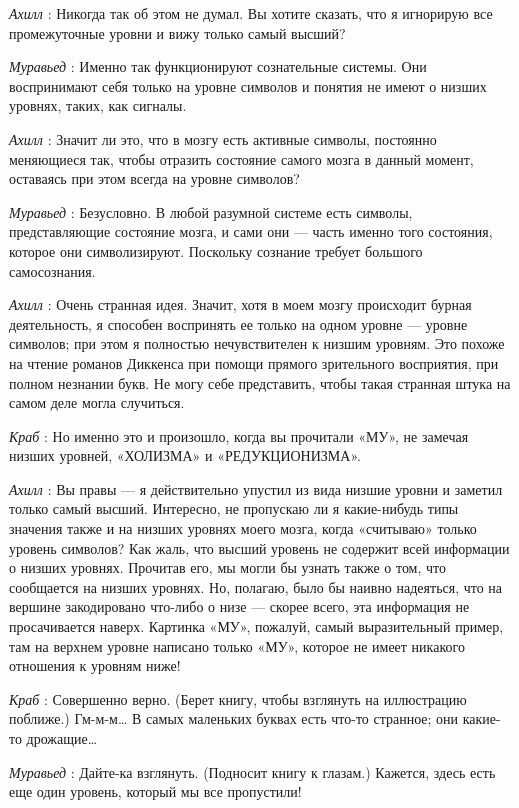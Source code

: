 \documentclass[../main.tex]{subfiles}
\begin{document}
\begin{dialogue}
\emph{Ахилл} : Никогда так об этом не думал. Вы хотите сказать, что я игнорирую все промежуточные уровни и вижу только самый высший?

\emph{Муравьед} : Именно так функционируют сознательные системы. Они воспринимают себя только на уровне символов и понятия не имеют о низших уровнях, таких, как сигналы.

\emph{Ахилл} : Значит ли это, что в мозгу есть активные символы, постоянно меняющиеся так, чтобы отразить состояние самого мозга в данный момент, оставаясь при этом всегда на уровне символов?

\emph{Муравьед} : Безусловно. В любой разумной системе есть символы, представляющие состояние мозга, и сами они --- часть именно того состояния, которое они символизируют. Поскольку сознание требует большого самосознания.

\emph{Ахилл} : Очень странная идея. Значит, хотя в моем мозгу происходит бурная деятельность, я способен воспринять ее только на одном уровне --- уровне символов; при этом я полностью нечувствителен к низшим уровням. Это похоже на чтение романов Диккенса при помощи прямого зрительного восприятия, при полном незнании букв. Не могу себе представить, чтобы такая странная штука на самом деле могла случиться.

\emph{Краб} : Но именно это и произошло, когда вы прочитали «МУ», не замечая низших уровней, «ХОЛИЗМА» и «РЕДУКЦИОНИЗМА».

\emph{Ахилл} : Вы правы --- я действительно упустил из вида низшие уровни и заметил только самый высший. Интересно, не пропускаю ли я какие-нибудь типы значения также и на низших уровнях моего мозга, когда «считываю» только уровень символов? Как жаль, что высший уровень не содержит всей информации о низших уровнях. Прочитав его, мы могли бы узнать также о том, что сообщается на низших уровнях. Но, полагаю, было бы наивно надеяться, что на вершине закодировано что-либо о низе --- скорее всего, эта информация не просачивается наверх. Картинка «МУ», пожалуй, самый выразительный пример, там на верхнем уровне написано только «МУ», которое не имеет никакого отношения к уровням ниже!

\emph{Краб} : Совершенно верно. (Берет книгу, чтобы взглянуть на иллюстрацию поближе.) Гм-м-м\ldots{} В самых маленьких буквах есть что-то странное; они какие-то дрожащие\ldots{}

\emph{Муравьед} : Дайте-ка взглянуть. (Подносит книгу к глазам.) Кажется, здесь есть еще один уровень, который мы все пропустили!


\end{dialogue}
\end{document}
